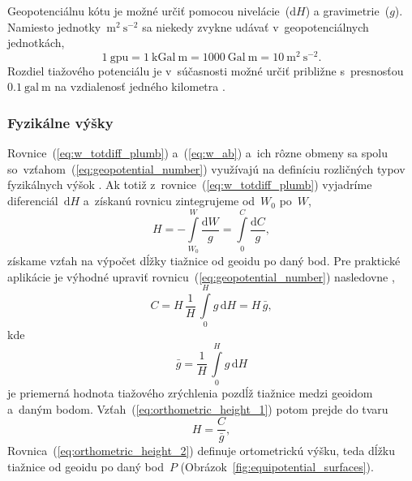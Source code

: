 \documentclass[a4paper,12pt]{book}
\newcommand{\diff}{\mathrm d}
\begin{document}
Geopotenciálnu kótu je možné určiť pomocou nivelácie~($\diff H$) 
a gravimetrie~($g$).  Namiesto jednotky~$\mathrm{m}^2\ \mathrm{s}^{-2}$ sa 
niekedy zvykne udávať v~geopotenciálnych jednotkách,
%
\begin{equation}
\label{eq:gpu_unit}
1\ \mathrm{gpu} = 1\ \mathrm{kGal} \ \mathrm{m} = 1000\ \mathrm{Gal}\ 
\mathrm{m} = 10\ \mathrm{m}^2 \ \mathrm{s}^{-2}{.}
\end{equation}
%
Rozdiel tiažového potenciálu je v~súčasnosti možné určiť približne s~presnosťou 
$0.1\ \mathrm{gal} \ \mathrm{m}$ na vzdialenosť jedného kilometra 
\parencite{MoritzPhysicalGeodesy}.

\subsubsection{Fyzikálne výšky}

Rovnice~(\ref{eq:w_totdiff_plumb}) a~(\ref{eq:w_ab}) a~ich rôzne obmeny sa 
spolu so~vzťahom~(\ref{eq:geopotential_number}) využívajú na definíciu 
rozličných typov fyzikálnych výšok \parencite[pozri 
napríklad][]{MoritzPhysicalGeodesy,SansoGeodeticHeights}.  Ak totiž 
z~rovnice~(\ref{eq:w_totdiff_plumb}) vyjadríme diferenciál~$\diff H$ a~získanú 
rovnicu zintegrujeme od~$W_0$ po~$W$,
%
\begin{equation}
\label{eq:orthometric_height_1}
H = -\int\limits_{W_0}^{W} \frac{\diff W}{g} = \int\limits_{0}^{C} \frac{\diff 
C}{g}{,}
\end{equation}
%
získame vzťah na výpočet dĺžky tiažnice od geoidu po daný bod.  Pre praktické 
aplikácie je výhodné upraviť rovnicu~(\ref{eq:geopotential_number}) nasledovne 
\parencite{MoritzPhysicalGeodesy},
%
\begin{equation}
C = H \, \frac{1}{H} \, \int\limits_0^H g \, \diff H = H \, \bar{g}{,}
\end{equation}
%
kde
%
\begin{equation}
\bar{g} = \frac{1}{H} \, \int\limits_0^H g \, \diff H
\end{equation}
%
je priemerná hodnota tiažového zrýchlenia pozdĺž tiažnice medzi geoidom a~daným 
bodom.  Vzťah~(\ref{eq:orthometric_height_1}) potom prejde do tvaru
%
\begin{equation}
\label{eq:orthometric_height_2}
H = \frac{C}{\bar{g}}{,}
\end{equation}
%
Rovnica~(\ref{eq:orthometric_height_2}) definuje ortometrickú výšku, teda dĺžku 
tiažnice od geoidu po daný bod~$P$ (Obrázok~\ref{fig:equipotential_surfaces}).
\end{document}
